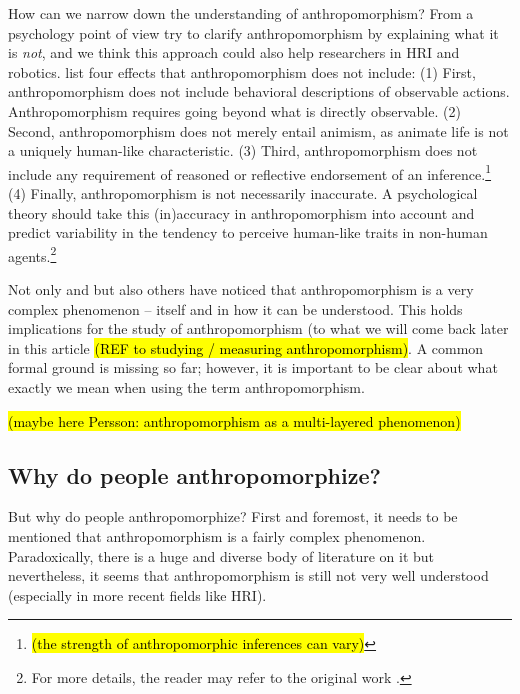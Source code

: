 \documentclass{frontiersSCNS} %
\begin{document}
How can we narrow down the understanding of anthropomorphism? From a psychology point of view \cite{epley_when_2008} try to clarify anthropomorphism by explaining what it is \textit{not}, and we think this approach could also help researchers in HRI and robotics. \cite{epley_when_2008} list four effects that anthropomorphism does not include:
(1) First, anthropomorphism does not include behavioral descriptions of observable actions. Anthropomorphism requires going beyond what is directly observable.
(2) Second, anthropomorphism does not merely entail animism, as animate life is not a uniquely human-like characteristic.
(3) Third, anthropomorphism does not include any requirement of reasoned or reflective endorsement of an inference.\footnote{\hl{(the strength of anthropomorphic inferences can vary)}}
(4) Finally, anthropomorphism is not necessarily inaccurate. A psychological theory should take this (in)accuracy in anthropomorphism into account and predict variability in the tendency to perceive human-like traits in non-human agents.\footnote{For more details, the reader may refer to the original work \citep{epley_when_2008}.}

Not only \cite{epley_when_2008} and \cite{duffy_anthropomorphism_2002} but also others have noticed that anthropomorphism is a very complex phenomenon -- itself and in how it can be understood. This holds implications for the study of anthropomorphism (to what we will come back later in this article \hl{(REF to studying / measuring anthropomorphism)}.
A common formal ground is missing so far; however, it is important to be clear about what exactly we mean when using the term anthropomorphism.

\hl{(maybe here Persson: anthropomorphism as a multi-layered phenomenon)}


%
%
%
%
%
%

\subsection{Why do people anthropomorphize?}
\label{sec:explanations}

But why do people anthropomorphize? First and foremost, it needs to be mentioned that anthropomorphism is a fairly complex phenomenon. Paradoxically, there is a huge and diverse body of literature on it but nevertheless, it seems that anthropomorphism is still not very well understood (especially in more recent fields like HRI).
\end{document}

